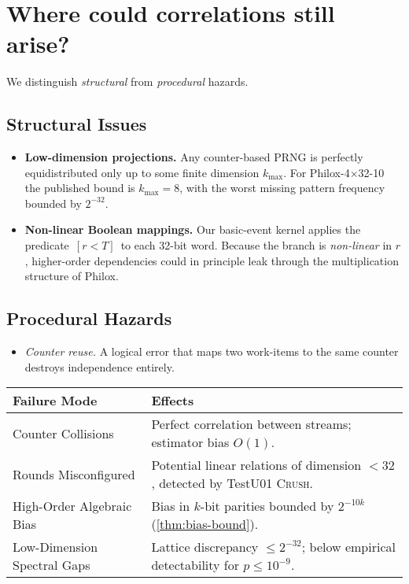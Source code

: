 \section{Where could correlations still arise?}
We distinguish \emph{structural} from \emph{procedural} hazards.

\subsection{Structural Issues}
\begin{itemize}
  \item\textbf{Low-dimension projections.}
        Any counter-based PRNG is perfectly equidistributed only up to
        some finite dimension \(k_{\max}\).  For Philox-4×32-10 the
        published bound is \(k_{\max}=8\), with the worst missing
        pattern frequency bounded by \(2^{-32}\).

  \item\textbf{Non-linear Boolean mappings.}
        Our basic-event kernel applies the predicate
        \(\,[r < T]\,\) to each 32-bit word.
        Because the branch is \emph{non-linear} in \(r\), higher-order
        dependencies could in principle leak through the
        multiplication structure of Philox.
\end{itemize}

\subsection{Procedural Hazards}
\begin{itemize}
  \item\emph{Counter reuse.}  A logical error that maps two
        work-items to the same counter destroys independence entirely.
\end{itemize}

\begin{center}
\begin{tabular}{@{}p{0.35\linewidth}@{\;}p{0.65\linewidth}@{}}
\toprule
\textbf{Failure Mode} & \textbf{Effects}\\
\midrule
Counter Collisions &
        Perfect correlation between streams; estimator bias \(O(1)\).\\
Rounds Misconfigured &
        Potential linear relations of dimension \(<32\), detected by
        TestU01 \textsc{Crush}.\\
High-Order Algebraic Bias &
        Bias in \(k\)-bit parities bounded by \(2^{-10k}\)
        (\ref{thm:bias-bound}).\\
Low-Dimension Spectral Gaps &
        Lattice discrepancy \(\le 2^{-32}\); below empirical
        detectability for \(p\le10^{-9}\).\\
\bottomrule
\end{tabular}
\end{center}

